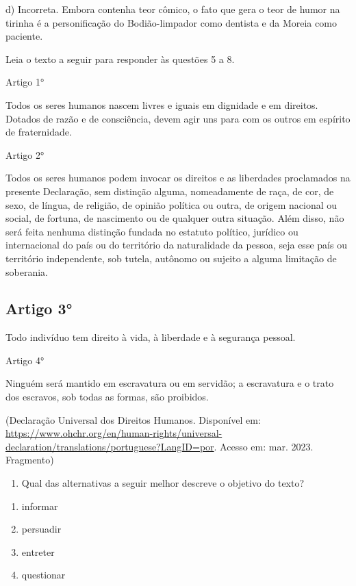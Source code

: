 d) Incorreta. Embora contenha teor cômico, o fato que gera o teor de
humor na tirinha é a personificação do Bodião-limpador como dentista e
da Moreia como paciente.

Leia o texto a seguir para responder às questões 5 a 8.

Artigo 1°

Todos os seres humanos nascem livres e iguais em dignidade e em
direitos. Dotados de razão e de consciência, devem agir uns para com os
outros em espírito de fraternidade.

Artigo 2°

Todos os seres humanos podem invocar os direitos e as liberdades
proclamados na presente Declaração, sem distinção alguma, nomeadamente
de raça, de cor, de sexo, de língua, de religião, de opinião política ou
outra, de origem nacional ou social, de fortuna, de nascimento ou de
qualquer outra situação. Além disso, não será feita nenhuma distinção
fundada no estatuto político, jurídico ou internacional do país ou do
território da naturalidade da pessoa, seja esse país ou território
independente, sob tutela, autônomo ou sujeito a alguma limitação de
soberania.


\subsection{Artigo 3°}
Todo indivíduo tem direito à vida, à liberdade e à segurança pessoal.

Artigo 4°

Ninguém será mantido em escravatura ou em servidão; a escravatura e o
trato dos escravos, sob todas as formas, são proibidos.

(Declaração Universal dos Direitos Humanos. Disponível em: 
\url{https://www.ohchr.org/en/human-rights/universal-declaration/translations/portuguese?LangID=por}.
Acesso em: mar. 2023. Fragmento)

\begin{enumerate}
\def\labelenumi{\arabic{enumi}.}
\setcounter{enumi}{4}
\tightlist
\item
  Qual das alternativas a seguir melhor descreve o objetivo do texto?
\end{enumerate}

\begin{enumerate}
\def\labelenumi{\alph{enumi})}
\item
  informar
\item
  persuadir
\item
  entreter
\item
  questionar
\end{enumerate}

